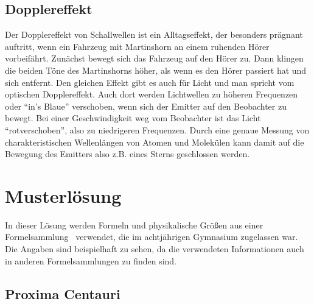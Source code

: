 \subsection{Dopplereffekt}

Der Dopplereffekt von Schallwellen ist ein Alltagseffekt, der besonders prägnant auftritt, wenn ein Fahrzeug mit Martinshorn an einem ruhenden Hörer vorbeifährt. Zunächst bewegt sich das Fahrzeug auf den Hörer zu. Dann klingen die beiden Töne des Martinshorns höher, als wenn es den Hörer passiert hat und sich entfernt. Den gleichen Effekt gibt es auch für Licht und man spricht vom optischen Dopplereffekt. Auch dort werden Lichtwellen zu höheren Frequenzen oder \enquote{in's Blaue} verschoben, wenn sich der Emitter auf den Beobachter zu bewegt. Bei einer Geschwindigkeit weg vom Beobachter ist das Licht \enquote{rotverschoben}, also zu niedrigeren Frequenzen. Durch eine genaue Messung von charakteristischen Wellenlängen von Atomen und Molekülen kann damit auf die Bewegung des Emitters also z.B. eines Sterns geschlossen werden.


\section{Musterlösung}

\begin{hinweis}
	In dieser Lösung werden Formeln und physikalische Größen aus einer Formelsammlung~\cite{Cornelsen2013} verwendet, die im achtjährigen Gymnasium zugelassen war. Die Angaben sind beispielhaft zu sehen, da die verwendeten Informationen auch in anderen Formelsammlungen zu finden sind.
\end{hinweis}

\subsection{Proxima Centauri}

